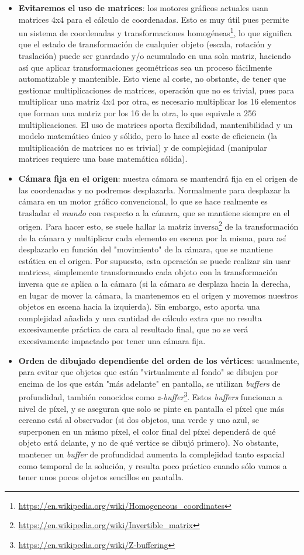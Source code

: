 \begin{itemize}
	\item \textbf{Evitaremos el uso de matrices}: los motores gráficos actuales usan matrices 4x4 para el cálculo de coordenadas. Esto es muy útil pues permite un sistema de coordenadas y transformaciones homogéneas\footnote{\url{https://en.wikipedia.org/wiki/Homogeneous_coordinates}}, lo que significa que el estado de transformación de cualquier objeto (escala, rotación y traslación) puede ser guardado y/o acumulado en una sola matriz, haciendo así que aplicar transformaciones geométricas sea un proceso fácilmente automatizable y mantenible. Esto viene al coste, no obstante, de tener que gestionar multiplicaciones de matrices, operación que no es trivial, pues para multiplicar una matriz 4x4 por otra, es necesario multiplicar los 16 elementos que forman una matriz por los 16 de la otra, lo que equivale a 256 multiplicaciones. El uso de matrices aporta flexibilidad, mantenibilidad y un modelo matemático único y sólido, pero lo hace al coste de eficiencia (la multiplicación de matrices no es trivial) y de complejidad (manipular matrices requiere una base matemática sólida).
	\item \textbf{Cámara fija en el origen}: nuestra cámara se mantendrá fija en el origen de las coordenadas y no podremos desplazarla. Normalmente para desplazar la cámara en un motor gráfico convencional, lo que se hace realmente es trasladar el \emph{mundo} con respecto a la cámara, que se mantiene siempre en el origen. Para hacer esto, se suele hallar la matriz inversa\footnote{\url{https://en.wikipedia.org/wiki/Invertible_matrix}} de la transformación de la cámara y multiplicar cada elemento en escena por la misma, para así desplazarlo en función del "movimiento" de la cámara, que se mantiene estática en el origen. Por supuesto, esta operación se puede realizar sin usar matrices, simplemente transformando cada objeto con la transformación inversa que se aplica a la cámara (si la cámara se desplaza hacia la derecha, en lugar de mover la cámara, la mantenemos en el origen y movemos nuestros objetos en escena hacia la izquierda). Sin embargo, esto aporta una complejidad añadida y una cantidad de cálculo extra que no resulta excesivamente práctica de cara al resultado final, que no se verá excesivamente impactado por tener una cámara fija.
	\item \textbf{Orden de dibujado dependiente del orden de los vértices}: usualmente, para evitar que objetos que están "virtualmente al fondo" se dibujen por encima de los que están "más adelante" en pantalla, se utilizan \emph{buffers} de profundidad, también conocidos como \emph{z-buffer}\footnote{\url{https://en.wikipedia.org/wiki/Z-buffering}}. Estos \emph{buffers} funcionan a nivel de píxel, y se aseguran que solo se pinte en pantalla el píxel que más cercano está al observador (si dos objetos, una verde y uno azul, se superponen en un mismo píxel, el color final del píxel dependerá de qué objeto está delante, y no de qué vertice se dibujó primero). No obstante, mantener un \emph{buffer} de profundidad aumenta la complejidad tanto espacial como temporal de la solución, y resulta poco práctico cuando sólo vamos a tener unos pocos objetos sencillos en pantalla.

\end{itemize}
